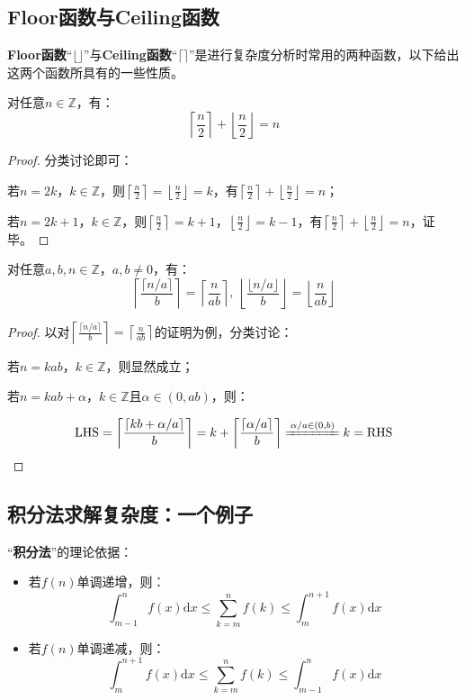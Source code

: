 \documentclass[12pt,a4paper,violet]{bbe}
\begin{document}
\subsection{Floor函数与Ceiling函数}
\textbf{Floor函数}“$\lfloor\rfloor$”与\textbf{Ceiling函数}“$\lceil\rceil$”是进行复杂度分析时常用的两种函数，以下给出这两个函数所具有的一些性质。
\begin{property}
	对任意$n\in\mathbb{Z}$，有：
	$$
	\left\lceil \frac{n}{2}\right\rceil+\left\lfloor \frac{n}{2}\right\rfloor=n
	$$
\end{property}
\begin{proof}
	分类讨论即可：
	
	若$n=2k$，$k\in \mathbb{Z}$，则$\left\lceil \frac{n}{2}\right\rceil=\left\lfloor \frac{n}{2}\right\rfloor=k$，有$	\left\lceil \frac{n}{2}\right\rceil+\left\lfloor \frac{n}{2}\right\rfloor=n$；
	
	若$n=2k+1$，$k\in \mathbb{Z}$，则$\left\lceil \frac{n}{2}\right\rceil=k+1$，$\left\lfloor \frac{n}{2}\right\rfloor=k-1$，有$	\left\lceil \frac{n}{2}\right\rceil+\left\lfloor \frac{n}{2}\right\rfloor=n$，证毕。
\end{proof}
\begin{property}
	对任意$a,b,n\in\mathbb{Z}$，$a,b\ne 0$，有：
	$$
	\left\lceil\frac{\lceil n/a\rceil}{b}\right\rceil=	\left\lceil\frac{n}{ab}\right\rceil,~\left\lfloor\frac{\lfloor n/a\rfloor}{b}\right\rfloor=\left\lfloor\frac{n}{ab}\right\rfloor
	$$
\end{property}
\begin{proof}
	以对$	\left\lceil\frac{\lceil n/a\rceil}{b}\right\rceil=	\left\lceil\frac{n}{ab}\right\rceil$的证明为例，分类讨论：
	
	若$n=kab$，$k\in\mathbb{Z}$，则显然成立；
	
	若$n=kab+\alpha$，$k\in\mathbb{Z}$且$\alpha\in(0,ab)$，则：
	
	$$
	\text{LHS}=\left\lceil\frac{\lceil kb+\alpha/a\rceil}{b}\right\rceil=k+\left\lceil\frac{\lceil \alpha/a\rceil}{b}\right\rceil\xlongequal[]{\alpha/a\in(0,b)}k=\text{RHS}
	$$
\end{proof}
\subsection{积分法求解复杂度：一个例子}
“\textbf{积分法}”的理论依据：
\begin{theorem}
	\begin{itemize}
		\item 若$f(n)$单调递增，则：
		$$
		\int_{m-1}^{n}f(x)\mathrm{d}x\leqslant\sum\limits_{k=m}^{n}f(k)\leqslant\int_{m}^{n+1}f(x)\mathrm{d}x
		$$
		\item 若$f(n)$单调递减，则：
		$$
		\int_{m}^{n+1}f(x)\mathrm{d}x\leqslant\sum\limits_{k=m}^{n}f(k)\leqslant\int_{m-1}^{n}f(x)\mathrm{d}x
		$$
	\end{itemize}
\end{theorem}
\end{document}
